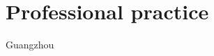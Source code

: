 \documentclass[]{baharmon-cv}
\begin{document}
\section{Professional practice}
\begin{minipage}[t]{0.85\textwidth} 
\end{minipage}
\begin{minipage}[t]{0.15\textwidth} 
Guangzhou%
\end{minipage}\\

\sectiondivider






\end{document}
